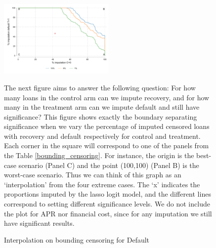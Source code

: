 \begin{figure}[H]
        \caption{Interpolation on bounding censoring for Default}
        \vspace{-1em}
    \label{interpolation_censoring_imp}
    \begin{center}
        \centering
        \includegraphics[width=0.5\textwidth]{Figuras/frontera_sig_def_imp.pdf}
    \end{center}
    \vspace{-1em}
     \scriptsize  {The next figure aims to answer the following question: For how many loans in the control arm can we impute recovery, and for how many in the treatment arm can we impute default and still have significance?
     This figure shows exactly the boundary separating significance when we vary the percentage of imputed censored loans with recovery and default respectively for control and treatment. Each corner in the square will correspond to one of the panels from the Table \ref{bounding_censoring}. For instance, the origin is the best-case scenario (Panel C) and the point (100,100) (Panel B) is the worst-case scenario. Thus we can think of this graph as an `interpolation' from the four extreme cases. The `x' indicates the proportions imputed by the lasso logit model, and the different lines correspond to setting different significance levels. We do not include the plot for APR nor financial cost, since for any imputation we still have significant results.}

\end{figure}





